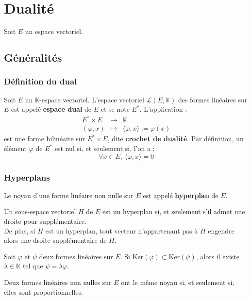 \documentclass[french]{article}
\newcommand{\K}{\mathbb{K}}
\newcommand{\st}{^*}
\renewcommand{\ker}{\text{Ker}}
\theoremstyle{plain}
\theoremstyle{definition}
\theoremstyle{remark}
\begin{document}
\section{Dualité}

Soit $E$ un espace vectoriel.

\subsection{Généralités}

\subsubsection*{Définition du dual}

Soit $E$ un $\K$-espace vectoriel. L'espace vectoriel $\mathcal{L}(E,\K)$ des formes linéaires sur $E$ est appelé \textbf{espace dual} de $E$ et se note $E\st$. L'application : $$\begin{array}{rcl}
	E\st\times E&\longrightarrow&\K\\
	(\varphi,x)&\longmapsto&\langle\varphi,x\rangle:=\varphi(x)
\end{array}$$ est une forme bilinéaire sur $E\st\times E$, dite \textbf{crochet de dualité}. Par définition, un élément $\varphi$ de $E\st$ est nul si, et seulement si, l'on a : $$\forall x\in E,\ \langle\varphi,x\rangle=0$$

\subsubsection*{Hyperplans}
\begin{dfn}
	Le noyau d'une forme linéaire non nulle sur $E$ est appelé \textbf{hyperplan} de $E$.
\end{dfn}

\begin{prop}%
	Un sous-espace vectoriel $H$ de $E$ est un hyperplan si, et seulement s'il admet une droite pour supplémentaire. \\
	De plus, si $H$ est un hyperplan, tout vecteur n'appartenant pas à $H$ engendre alors une droite supplémentaire de $H$.
\end{prop}

\begin{lem}%
	Soit $\varphi$ et $\psi$ deux formes linéaires sur $E$. Si $\ker(\varphi)\subset\ker(\psi)$, alors il existe $\lambda\in\K$ tel que $\psi=\lambda\varphi$.
\end{lem}

\begin{prop}%
	Deux formes linéaires non nulles sur $E$ ont le même noyau si, et seulement si, elles sont proportionnelles.
\end{prop}
\end{document}
